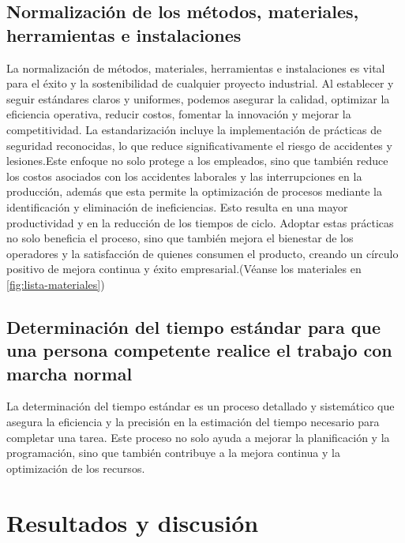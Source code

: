     \subsection{Normalización de los métodos, materiales, herramientas e instalaciones}
    La normalización de métodos, materiales, herramientas e instalaciones es vital para el éxito y la sostenibilidad de cualquier proyecto industrial. Al establecer y seguir estándares claros y uniformes, podemos asegurar la calidad, optimizar la eficiencia operativa, reducir costos, fomentar la innovación y mejorar la competitividad.
    La estandarización incluye la implementación de prácticas de seguridad reconocidas, lo que reduce significativamente el riesgo de accidentes y lesiones.Este enfoque no solo protege a los empleados, sino que también reduce los costos asociados con los accidentes laborales y las interrupciones en la producción, además que esta permite la optimización de procesos mediante la identificación y eliminación de ineficiencias. Esto resulta en una mayor productividad y en la reducción de los tiempos de ciclo.
    Adoptar estas prácticas no solo beneficia el proceso, sino que también mejora el bienestar de los operadores y la satisfacción de quienes consumen el producto, creando un círculo positivo de mejora continua y éxito empresarial.(Véanse los materiales en \ref{fig:lista-materiales})
    
    \subsection{Determinación del tiempo estándar para que una persona competente realice el trabajo con marcha normal}
    La determinación del tiempo estándar es un proceso detallado y sistemático que asegura la eficiencia y la precisión en la estimación del tiempo necesario para completar una tarea. Este proceso no solo ayuda a mejorar la planificación y la programación, sino que también contribuye a la mejora continua y la optimización de los recursos.
    \section{Resultados y discusión}
    
